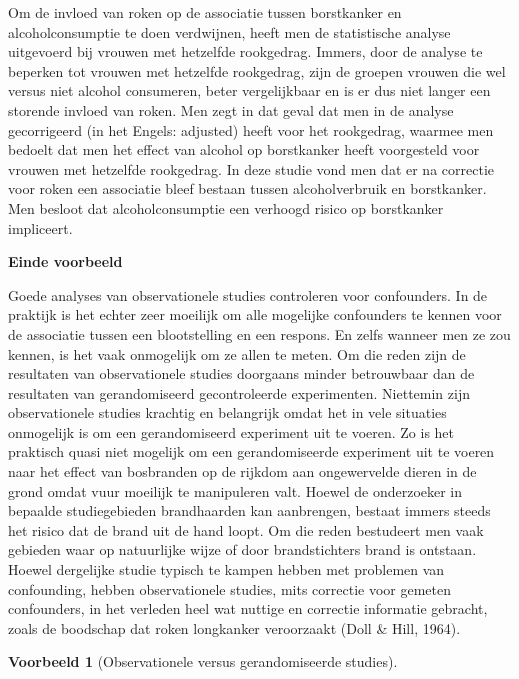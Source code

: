 \documentclass[
  dutch,
  letterpaper,
  12pt]{book}
\theoremstyle{definition}
\theoremstyle{definition}
\theoremstyle{definition}
\newtheorem{example}{Voorbeeld}[chapter]
\theoremstyle{remark}
\begin{document}
Om de invloed van roken op de associatie tussen borstkanker en
alcoholconsumptie te doen verdwijnen, heeft men de statistische analyse
uitgevoerd bij vrouwen met hetzelfde rookgedrag. Immers, door de analyse
te beperken tot vrouwen met hetzelfde rookgedrag, zijn de groepen
vrouwen die wel versus niet alcohol consumeren, beter vergelijkbaar en
is er dus niet langer een storende invloed van roken. Men zegt in dat
geval dat men in de analyse gecorrigeerd (in het Engels: adjusted) heeft
voor het rookgedrag, waarmee men bedoelt dat men het effect van alcohol
op borstkanker heeft voorgesteld voor vrouwen met hetzelfde rookgedrag.
In deze studie vond men dat er na correctie voor roken een associatie
bleef bestaan tussen alcoholverbruik en borstkanker. Men besloot dat
alcoholconsumptie een verhoogd risico op borstkanker impliceert.

\textbf{Einde voorbeeld}

Goede analyses van observationele studies controleren voor confounders.
In de praktijk is het echter zeer moeilijk om alle mogelijke confounders
te kennen voor de associatie tussen een blootstelling en een respons. En
zelfs wanneer men ze zou kennen, is het vaak onmogelijk om ze allen te
meten. Om die reden zijn de resultaten van observationele studies
doorgaans minder betrouwbaar dan de resultaten van gerandomiseerd
gecontroleerde experimenten. Niettemin zijn observationele studies
krachtig en belangrijk omdat het in vele situaties onmogelijk is om een
gerandomiseerd experiment uit te voeren. Zo is het praktisch quasi niet
mogelijk om een gerandomiseerde experiment uit te voeren naar het effect
van bosbranden op de rijkdom aan ongewervelde dieren in de grond omdat
vuur moeilijk te manipuleren valt. Hoewel de onderzoeker in bepaalde
studiegebieden brandhaarden kan aanbrengen, bestaat immers steeds het
risico dat de brand uit de hand loopt. Om die reden bestudeert men vaak
gebieden waar op natuurlijke wijze of door brandstichters brand is
ontstaan. Hoewel dergelijke studie typisch te kampen hebben met
problemen van confounding, hebben observationele studies, mits correctie
voor gemeten confounders, in het verleden heel wat nuttige en correctie
informatie gebracht, zoals de boodschap dat roken longkanker veroorzaakt
(Doll \& Hill, 1964).

\begin{example}[Observationele versus gerandomiseerde
studies]\protect\hypertarget{exm-observationele-versus-gerandomiseerde-studies}{}\label{exm-observationele-versus-gerandomiseerde-studies}

~

\end{example}
\end{document}
